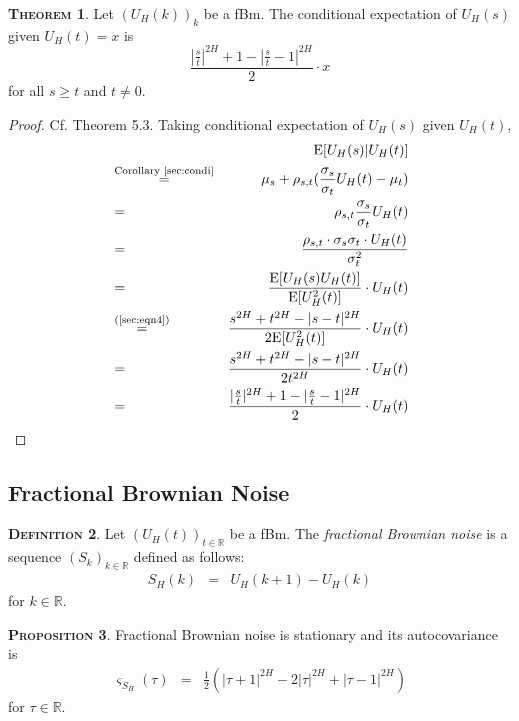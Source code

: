 \documentclass[a4paper, twoside, 11pt]{article}
\theoremstyle{definition}
\newtheorem{definition}{\scshape Definition}[section]
\newtheorem{theorem}[definition]{\scshape Theorem}
\newtheorem{proposition}[definition]{\scshape Proposition}
\begin{document}
  \begin{theorem}
	Let $(U_H(k))_{k}$ be a fBm. The conditional expectation of $U_H(s)$  given $U_H(t)=x$ is
  \begin{equation*}
	\frac{|\frac{s}{t}|^{2H} + 1 - |\frac{s}{t} - 1|^{2H}}{2} \cdot x
  \end{equation*}
  for all $ s \ge t$ and $t \neq 0$.
  \end{theorem}
  \begin{proof}
	Cf. \cite{mandelbrot} Theorem 5.3. Taking conditional expectation of $U_H(s)$ given $U_H(t)$,
	\begin{eqnarray*}
	&&\mathrm{E}[U_H(s)|U_H(t)]\\
	&\overset{\text{Corollary \ref{sec:condi}}}{=}& \mu_s + \rho_{s,t} (\frac{\sigma_s}{\sigma_t}U_H(t) - \mu_t)\\
	&=& \rho_{s,t}\frac{\sigma_s}{\sigma_t}U_H(t)\\
	&=& \frac{\rho_{s,t}\cdot\sigma_s\sigma_t\cdot U_H(t)}{\sigma_t^2}\\
	&=& \frac{\mathrm{E}[U_H(s)U_H(t)]}{\mathrm{E}[U_H^2(t)]} \cdot U_H(t)\\
	&\overset{\text{(\ref{sec:eqn4})}}{=}& \frac{s^{2H} + t^{2H} - |s-t|^{2H}}{2\mathrm{E}[U_H^2(t)]}\cdot U_H(t)\\
	&=&  \frac{s^{2H} + t^{2H} - |s-t|^{2H}}{2t^{2H}}\cdot U_H(t)\\
	&=& \frac{|\frac{s}{t}|^{2H} + 1 - |\frac{s}{t} - 1|^{2H}}{2} \cdot U_H(t)
	\end{eqnarray*}
  \end{proof}

  \subsection{Fractional Brownian Noise}
  \begin{definition}
	Let $(U_H(t))_{t\in \mathbb{R}}$ be a fBm. The \emph{fractional Brownian noise} is a sequence $(S_k)_{k\in \mathbb{R}}$ defined as follows:
  \begin{eqnarray*}
	S_H(k) &=& U_H(k+1) - U_H(k)
  \end{eqnarray*}
  for $k \in \mathbb{R}$.
  \end{definition}
  \begin{proposition}
	Fractional Brownian noise is stationary and its autocovariance is 
	\begin{eqnarray}
	  \varsigma_{S_H}(\tau) &=&  \frac{1}{2} (|\tau + 1|^{2H} - 2|\tau|^{2H} + |\tau-1|^{2H})
	\label{sec:auto}
	\end{eqnarray}
	for $\tau \in \mathbb{R}$.
  \end{proposition}
\end{document}
